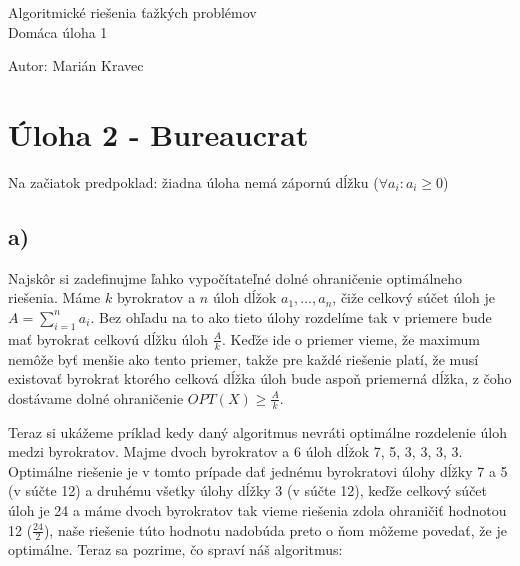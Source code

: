\documentclass[a4paper]{article}
\begin{document}
 
	
\pagestyle{plain}

\begin{center}
	\sc\large
	Algoritmické riešenia ťažkých problémov\\
	Domáca úloha 1
\end{center}

Autor: Marián Kravec

\section{Úloha 2 - Bureaucrat}

Na začiatok predpoklad: žiadna úloha nemá zápornú dĺžku ($\forall a_i: a_i\geq 0$)

\subsection*{a)}

Najskôr si zadefinujme ľahko vypočítateľné dolné ohraničenie optimálneho riešenia. Máme $k$ byrokratov a $n$ úloh dĺžok $a_1, ..., a_n$, čiže celkový súčet úloh je $A = \sum_{i=1}^{n} a_i$. Bez ohľadu na to ako tieto úlohy rozdelíme tak v priemere bude mať byrokrat celkovú dĺžku úloh $\frac{A}{k}$. Keďže ide o priemer vieme, že maximum nemôže byť menšie ako tento priemer, takže pre každé riešenie platí, že musí existovať byrokrat ktorého celková dĺžka úloh bude aspoň priemerná dĺžka, z čoho dostávame dolné ohraničenie $OPT(X) \geq \frac{A}{k}$.

Teraz si ukážeme príklad kedy daný algoritmus nevráti optimálne rozdelenie úloh medzi byrokratov. Majme dvoch byrokratov a 6 úloh dĺžok 7, 5, 3, 3, 3, 3.
Optimálne riešenie je v tomto prípade dať jednému byrokratovi úlohy dĺžky 7 a 5 (v súčte 12) a druhému všetky úlohy dĺžky 3 (v súčte 12), keďže celkový súčet úloh je 24 a máme dvoch byrokratov tak vieme riešenia zdola ohraničiť hodnotou 12 ($\frac{24}{2}$), naše riešenie túto hodnotu nadobúda preto o ňom môžeme povedať, že je optimálne. Teraz sa pozrime, čo spraví náš algoritmus: 
\end{document}
